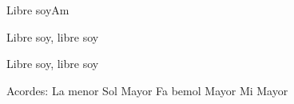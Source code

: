 \documentclass[12pt, spanish]{book}
\begin{document}
\begin{song}{Libre soy}{Am}
\begin{SBOpGroup}
            Libre soy, libre soy    

            Libre soy, libre soy    
        \end{SBOpGroup}


        \ifChordBk
        \begin{SBOpGroup}
            Acordes:\break
            \upchord{\Am}La menor \hfill
            \upchord{\G}\qquad Sol Mayor \hfill\null\break
            \upchord{\F}\qquad Fa bemol Mayor \hfill
            \upchord{\E}\qquad Mi Mayor \hfill\null\break
        \end{SBOpGroup}
        \fi
    \end{song}
\end{document}
